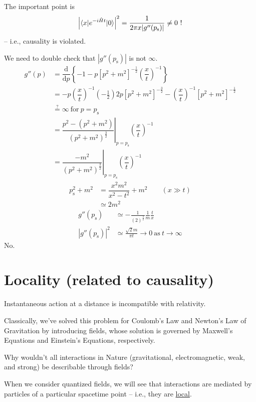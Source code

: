 \documentclass{article}
\begin{document}

\noindent The important point is
\begin{equation*}
    {\left| \braket{ x | e^{ -i \hat{H} t } | 0 } \right|}^2 = \dfrac{1}{ 2 \pi x | g'' (p_\mathrm{s}) | } \neq 0 ~ !
\end{equation*}
-- i.e., causality is violated.

\noindent We need to double check that $ | g'' (p_\mathrm{s}) | $ is not $\infty$.
\begin{align*}
    g'' (p) &= \dfrac{\mathrm{d}}{\mathrm{d} p} \left\lbrace  -1 - p {[ p^2 + m^2 ]}^{-\frac{1}{2}} {\left( \dfrac{x}{t} \right)}^{-1} \right\rbrace \\
    &= - p {\left( \dfrac{x}{t} \right)}^{-1} \left( -\tfrac{1}{2} \right) 2p {[ p^2 + m^2 ]}^{-\frac{3}{2}} - {\left( \dfrac{x}{t} \right)}^{-1} {[ p^2 + m^2 ]}^{-\frac{1}{2}} \\
    &\stackrel{?}{=} \infty ~ \mathrm{for} ~ p = p_\mathrm{s} \\
    &= {\left. \dfrac{ p^2 - ( p^2 + m^2 ) }{ { ( p^2 + m^2 ) }^\frac{3}{2} } \right|}_{ p = p_\mathrm{s} } {\left( \dfrac{x}{t} \right)}^{-1} \\
    &= {\left. \dfrac{ - m^2 }{ { ( p^2 + m^2 ) }^\frac{3}{2} } \right|}_{ p = p_\mathrm{s} } {\left( \dfrac{x}{t} \right)}^{-1}
\end{align*}
\begin{align*}
    p_\mathrm{s}^2 + m^2 &= \dfrac{ x^2 m^2 }{ x^2 - t^2 } + m^2 \qquad ( x\gg t ) \\
    & \simeq 2 m^2
\end{align*}
\begin{align*}
    g'' (p_\mathrm{s}) &\simeq -\frac{1}{ {(2)}^\frac{3}{2} } \frac{1}{m} \frac{t}{x} \\
    {|g'' (p_\mathrm{s}) |}^2 &\simeq \frac{ \sqrt{2} m }{ \pi t } \longrightarrow 0 ~ \mathrm{as} ~ t \longrightarrow \infty
\end{align*}
No.

\section{Locality (related to causality)}

\noindent Instantaneous action at a distance is incompatible with relativity.

\noindent Classically, we've solved this problem for Coulomb's Law and Newton's Law of Gravitation by introducing fields, whose solution is governed by Maxwell's Equations and Einstein's Equations, respectively.


\noindent Why wouldn't all interactions in Nature (gravitational, electromagnetic, weak, and strong) be describable through fields?

\noindent When we consider quantized fields, we will see that interactions are mediated by particles of a particular spacetime point -- i.e., they are \underline{local}.
\end{document}
